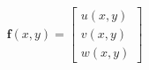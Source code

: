 \documentclass[preview]{standalone}
\begin{document}
\begin{align*}
\mathbf{f}(x,y) = \begin{bmatrix} u(x,y) \\ v(x,y) \\ w(x,y) \end{bmatrix}
\end{align*}
\end{document}
